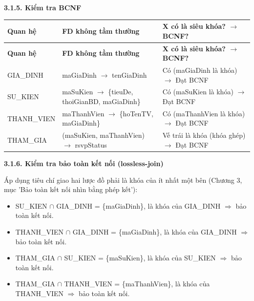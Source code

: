 \vspace{1.4em}
{}
{\large\bfseries 3.1.5. Kiểm tra BCNF}\par\vspace{0.6em}

\begingroup
\renewcommand{\arraystretch}{1.25}
\setlength{\tabcolsep}{5pt}
\begin{longtable}{|>{\raggedright\arraybackslash}p{}|>{\raggedright\arraybackslash}p{}|>{\raggedright\arraybackslash}p{}|}
	\hline
	\textbf{Quan hệ} & \textbf{FD không tầm thường} & \textbf{X có là siêu khóa? $\rightarrow$ BCNF?} \\ \hline
	\endfirsthead
	\hline
	\textbf{Quan hệ} & \textbf{FD không tầm thường} & \textbf{X có là siêu khóa? $\rightarrow$ BCNF?} \\ \hline
	\endhead
	GIA\_DINH & maGiaDinh $\rightarrow$ tenGiaDinh & Có (maGiaDinh là khóa) $\rightarrow$ Đạt BCNF \\ \hline
	SU\_KIEN & maSuKien $\rightarrow$ \{tieuDe, thoiGianBD, maGiaDinh\} & Có (maSuKien là khóa) $\rightarrow$ Đạt BCNF \\ \hline
	THANH\_VIEN & maThanhVien $\rightarrow$ \{hoTenTV, maGiaDinh\} & Có (maThanhVien là khóa) $\rightarrow$ Đạt BCNF \\ \hline
	THAM\_GIA & (maSuKien, maThanhVien) $\rightarrow$ rsvpStatus & Vế trái là khóa (khóa ghép) $\rightarrow$ Đạt BCNF \\ \hline
\end{longtable}
\endgroup

\vspace{1.4em}
{}
{\large\bfseries 3.1.6. Kiểm tra bảo toàn kết nối (lossless-join)}\par\vspace{0.6em}

Áp dụng tiêu chí giao hai lược đồ phải là khóa của ít nhất một bên (Chương 3, mục 'Bảo toàn kết nối nhìn bằng phép kết'):

\begin{itemize}
	\item SU\_KIEN $\cap$ GIA\_DINH = \{maGiaDinh\}, là khóa của GIA\_DINH $\Rightarrow$ bảo toàn kết nối.
	\item THANH\_VIEN $\cap$ GIA\_DINH = \{maGiaDinh\}, là khóa của GIA\_DINH $\Rightarrow$ bảo toàn kết nối.
	\item THAM\_GIA $\cap$ SU\_KIEN = \{maSuKien\}, là khóa của SU\_KIEN $\Rightarrow$ bảo toàn kết nối.
	\item THAM\_GIA $\cap$ THANH\_VIEN = \{maThanhVien\}, là khóa của THANH\_VIEN $\Rightarrow$ bảo toàn kết nối.
\end{itemize}

